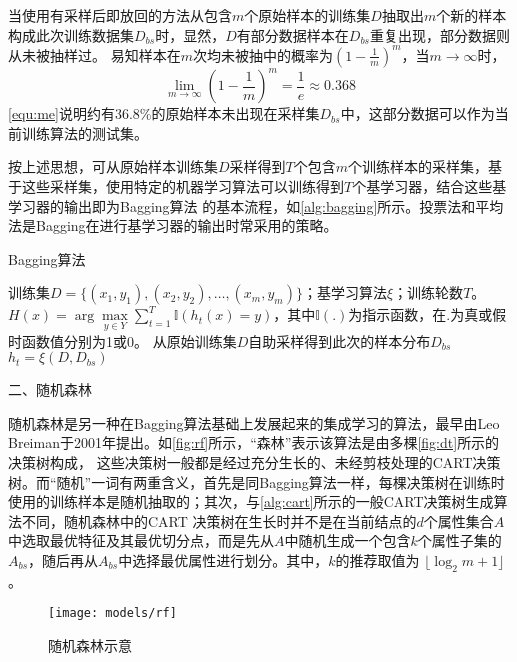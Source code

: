 当使用有采样后即放回的方法从包含$m$个原始样本的训练集$D$抽取出$m$个新的样本构成此次训练数据集$D_{bs}$时，显然，$D$有部分数据样本在$D_{bs}$重复出现，部分数据则从未被抽样过。
易知样本在$m$次均未被抽中的概率为$(1-\frac{1}{m})^m$，当$m \to \infty$时，
\begin{equation}
    \label{equ:me}
    \lim_{m \to \infty}{(1-\frac{1}{m})}^m = \frac{1}{e} \approx 0.368
\end{equation}
\autoref{equ:me}说明约有36.8\%的原始样本未出现在采样集$D_{bs}$中，这部分数据可以作为当前训练算法的测试集。

按上述思想，可从原始样本训练集$D$采样得到$T$个包含$m$个训练样本的采样集，基于这些采样集，使用特定的机器学习算法可以训练得到$T$个基学习器，结合这些基学习器的输出即为Bagging算法
的基本流程，如\autoref{alg:bagging}所示。投票法和平均法是Bagging在进行基学习器的输出时常采用的策略。
\begin{breakablealgorithm}
    \caption[Bagging算法]{Bagging算法\cite{Zhou2016}}
    \label{alg:bagging}
    \begin{algorithmic}[1] %
        \Require 训练集$D=\{(x_1,y_1),(x_2,y_2),\dots,(x_m,y_m)\}$；基学习算法$\xi$；训练轮数$T$。
        \Ensure $H(x)=\arg \max \limits_{y \in Y} \sum_{t=1}^T \mathbb{I}(h_t(x)=y)$，其中$\mathbb{I}(.)$为指示函数，在$.$为真或假时函数值分别为1或0。
            \State 从原始训练集$D$自助采样得到此次的样本分布$D_{bs}$
            \State $h_t=\xi (D,D_{bs})$
        \EndFor
    \end{algorithmic}
\end{breakablealgorithm}

二、随机森林

随机森林是另一种在Bagging算法基础上发展起来的集成学习的算法，最早由Leo Breiman于2001年提出\cite{breiman2001}。如\autoref{fig:rf}所示，“森林”表示该算法是由多棵\autoref{fig:dt}所示的决策树构成，
这些决策树一般都是经过充分生长的、未经剪枝处理的CART决策树。而“随机”一词有两重含义，首先是同Bagging算法一样，每棵决策树在训练时使用的训练样本是随机抽取的；其次，与\autoref{alg:cart}所示的一般CART决策树生成算法不同，随机森林中的CART
决策树在生长时并不是在当前结点的$d$个属性集合$A$中选取最优特征及其最优切分点，而是先从$A$中随机生成一个包含$k$个属性子集的$A_{bs}$，随后再从$A_{bs}$中选择最优属性进行划分\cite{Zhou2016,Liu2018,breiman2001}。其中，$k$的推荐取值为
$\lfloor \log_2m + 1 \rfloor$\cite{breiman2001}。

\begin{figure}[htbp]
    \centering
    \texttt{[image: models/rf]}
    \caption{\label{fig:rf}随机森林示意}
\end{figure}

